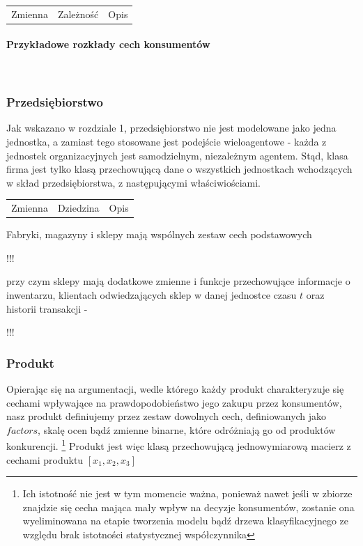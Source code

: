 \documentclass{article}
\begin{document}
\begin{center}
\begin{tabular}{ c c c }
Zmienna & Zależność & Opis \\ 
\end{tabular}
\end{center}

\paragraph{Przykładowe rozkłady cech konsumentów} \mbox{}\\

\subsubsection{Przedsiębiorstwo}

Jak wskazano w rozdziale 1, przedsiębiorstwo nie jest modelowane jako jedna jednostka, a zamiast tego stosowane jest podejście wieloagentowe - każda z jednostek organizacyjnych jest samodzielnym, niezależnym agentem. Stąd, klasa firma jest tylko klasą przechowującą dane o wszystkich jednostkach wchodzących w skład przedsiębiorstwa, z następującymi właściwiościami.

\begin{center}
\begin{tabular}{ c c c }
Zmienna & Dziedzina & Opis \\ 
\end{tabular}
\end{center}

Fabryki, magazyny i sklepy mają wspólnych zestaw cech podstawowych 

!!!

przy czym sklepy mają dodatkowe zmienne i funkcje przechowujące informacje o inwentarzu, klientach odwiedzających sklep w danej jednostce czasu $t$ oraz historii transakcji - 

!!!


\subsubsection{Produkt}

Opierając się na argumentacji, wedle którego każdy produkt charakteryzuje się cechami wpływające na prawdopodobieństwo jego zakupu przez konsumentów, nasz produkt definiujemy przez zestaw dowolnych cech, definiowanych jako $factors$, skalę ocen bądź zmienne binarne, które odróżniają go od produktów konkurencji. \footnote{Ich istotność nie jest w tym momencie ważna, ponieważ nawet jeśli w zbiorze znajdzie się cecha mająca mały wpływ na decyzje konsumentów, zostanie ona wyeliminowana na etapie tworzenia modelu bądź drzewa klasyfikacyjnego ze względu brak istotności statystycznej współczynnika} Produkt jest więc klasą przechowującą jednowymiarową macierz z cechami produktu $[x_1,x_2,x_3]$
\end{document}
